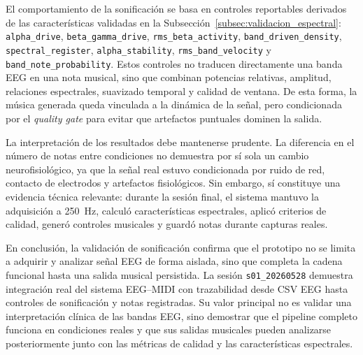 El comportamiento de la sonificación se basa en controles reportables derivados de las características validadas en la Subsección~\ref{subsec:validacion_espectral}: \texttt{alpha\_drive}, \texttt{beta\_gamma\_drive}, \texttt{rms\_beta\_activity}, \texttt{band\_driven\_density}, \texttt{spectral\_register}, \texttt{alpha\_stability}, \texttt{rms\_band\_velocity} y \texttt{band\_note\_probability}. Estos controles no traducen directamente una banda EEG en una nota musical, sino que combinan potencias relativas, amplitud, relaciones espectrales, suavizado temporal y calidad de ventana. De esta forma, la música generada queda vinculada a la dinámica de la señal, pero condicionada por el \textit{quality gate} para evitar que artefactos puntuales dominen la salida.

La interpretación de los resultados debe mantenerse prudente. La diferencia en el número de notas entre condiciones no demuestra por sí sola un cambio neurofisiológico, ya que la señal real estuvo condicionada por ruido de red, contacto de electrodos y artefactos fisiológicos. Sin embargo, sí constituye una evidencia técnica relevante: durante la sesión final, el sistema mantuvo la adquisición a \SI{250}{\hertz}, calculó características espectrales, aplicó criterios de calidad, generó controles musicales y guardó notas durante capturas reales.

En conclusión, la validación de sonificación confirma que el prototipo no se limita a adquirir y analizar señal EEG de forma aislada, sino que completa la cadena funcional hasta una salida musical persistida. La sesión \texttt{s01\_20260528} demuestra integración real del sistema EEG--MIDI con trazabilidad desde CSV EEG hasta controles de sonificación y notas registradas. Su valor principal no es validar una interpretación clínica de las bandas EEG, sino demostrar que el pipeline completo funciona en condiciones reales y que sus salidas musicales pueden analizarse posteriormente junto con las métricas de calidad y las características espectrales.

